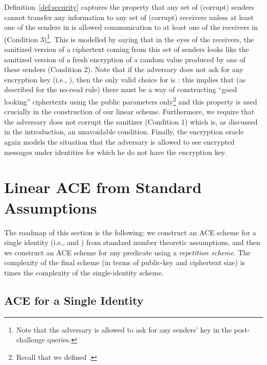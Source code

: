 \documentclass{llncs}
\begin{document}
Definition~\ref{def:security} captures the property that any set of (corrupt) senders  cannot transfer any information to any set of (corrupt) receivers  unless at least one of the senders in  is allowed communication to at least one of the receivers in  (Condition 3)\footnote{Note that the adversary is allowed to ask for any senders' key in the post-challenge queries.}. This is modelled by saying that in the eyes of the receivers, the sanitized version of a ciphertext coming from this set of senders looks like the sanitized version of a fresh encryption of a random value produced by one of these senders (Condition 2). Note that if the adversary does not ask for any encryption key (i.e., ), then the only valid choice for  is : this implies that (as described for the no-read rule) there must be a way of constructing ``good looking'' ciphertexts using the public parameters only\footnote{Recall that we defined .} and this property is used crucially in the construction of our linear scheme. 
Furthermore, we require that the adversary does not corrupt the sanitizer (Condition 1) which is, as discussed in the introduction, an unavoidable condition. 
Finally, the encryption oracle  again models the situation that the adversary is allowed to see encrypted messages under identities for which he do not have the encryption key.






\section{Linear ACE from Standard Assumptions}\label{sec:linear}


The roadmap of this section is the following: we construct an ACE scheme for a single identity (i.e.,  and ) from standard number theoretic assumptions, and then we construct an ACE scheme for any predicate  using a \emph{repetition scheme}. The complexity of the final scheme (in terms of public-key and ciphertext size) is  times the complexity of the single-identity scheme.






\subsection{ACE for a Single Identity}
\end{document}
